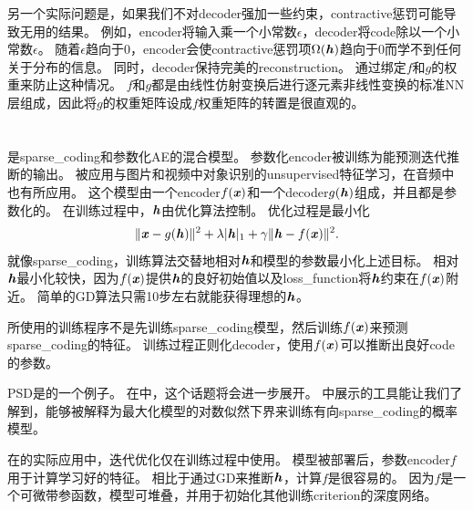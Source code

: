 另一个实际问题是，如果我们不对\gls{decoder}强加一些约束，\gls{contractive}惩罚可能导致无用的结果。
例如，\gls{encoder}将输入乘一个小常数$\epsilon$，\gls{decoder}将\gls{code}除以一个小常数$\epsilon$。
随着$\epsilon$趋向于0，\gls{encoder}会使\gls{contractive}惩罚项$\Omega(\boldsymbol{\mathit{h}})$趋向于0而学不到任何关于分布的信息。
同时，\gls{decoder}保持完美的\gls{reconstruction}。
\citet{Rifai+al-2011-small}通过绑定$f$和$g$的权重来防止这种情况。
$f$和$g$都是由线性仿射变换后进行逐元素非线性变换的标准\gls{NN}层组成，因此将$g$的权重矩阵设成$f$权重矩阵的转置是很直观的。


\section{}
\label{sec:predictive_sparse_decomposition}

是\gls{sparse_coding}和参数化\gls{AE}\citep{koray-psd-08}的混合模型。
参数化\gls{encoder}被训练为能预测迭代推断的输出。
被应用与图片和视频中对象识别的\gls{unsupervised}特征学习\citep{Koray-08-small,koray-nips-10-small,Jarrett-ICCV2009-small,farabet-suml-11}，在音频中也有所应用\citep{henaff-ismir-11-small}。
这个模型由一个\gls{encoder}$f(\boldsymbol{\mathit{x}})$和一个\gls{decoder}$g(\boldsymbol{\mathit{h}})$组成，并且都是参数化的。
在训练过程中，$\boldsymbol{\mathit{h}}$由优化算法控制。
优化过程是最小化
\begin{align}
 \| \boldsymbol{\mathit{x}} - g(\boldsymbol{\mathit{h}}) \| ^2 + \lambda | \boldsymbol{\mathit{h}} |_1 + \gamma \| \boldsymbol{\mathit{h}} - f(\boldsymbol{\mathit{x}}) \|^2.
\end{align}
就像\gls{sparse_coding}，训练算法交替地相对$\boldsymbol{\mathit{h}}$和模型的参数最小化上述目标。
相对$\boldsymbol{\mathit{h}}$最小化较快，因为$f(\boldsymbol{\mathit{x}})$提供$\boldsymbol{\mathit{h}}$的良好初始值以及\gls{loss_function}将$\boldsymbol{\mathit{h}}$约束在$f(\boldsymbol{\mathit{x}})$附近。
简单的\gls{GD}算法只需10步左右就能获得理想的$\boldsymbol{\mathit{h}}$。


所使用的训练程序不是先训练\gls{sparse_coding}模型，然后训练$f(\boldsymbol{\mathit{x}})$来预测\gls{sparse_coding}的特征。
训练过程正则化\gls{decoder}，使用$f(\boldsymbol{\mathit{x}})$可以推断出良好\gls{code}的参数。


\gls{PSD}是的一个例子。
在中，这个话题将会进一步展开。
中展示的工具能让我们了解到，能够被解释为最大化模型的对数似然下界来训练有向\gls{sparse_coding}的概率模型。


在的实际应用中，迭代优化仅在训练过程中使用。
模型被部署后，参数\gls{encoder}$f$用于计算学习好的特征。
相比于通过\gls{GD}来推断$\boldsymbol{\mathit{h}}$，计算$f$是很容易的。
因为$f$是一个可微带参函数，模型可堆叠，并用于初始化其他训练\gls{criterion}的深度网络。

